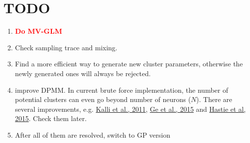 \documentclass[]{article}
\begin{document}
\section{TODO}
\begin{enumerate}
	\def\labelenumi{(\arabic{enumi})}
	\item
	\textcolor{red}{\textbf{Do MV-GLM}}\\
	\item
	Check sampling trace and mixing.
	\item
	Find a more efficient way to generate new cluster parameters, otherwise the newly generated ones will always be rejected.
	\item
	improve DPMM. In current brute force implementation, the number of potential clusters can even go beyond number of neurons (\(N\)). There are several improvements, e.g. \href{https://link.springer.com/article/10.1007/s11222-009-9150-y}{Kalli et al., 2011}, \href{http://proceedings.mlr.press/v37/gea15.html}{Ge et al., 2015} and \href{https://link.springer.com/article/10.1007/s11222-014-9471-3}{Hastie et al, 2015}. Check them later.
	\item
	After all of them are resolved, switch to GP version
	
\end{enumerate}
\end{document}
